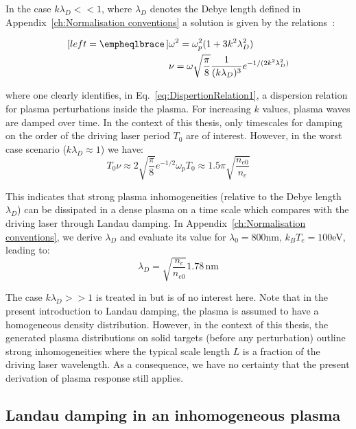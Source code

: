 \noindent In the case $k \lambda_D << 1$, where $\lambda_D$ denotes the Debye length defined in Appendix~\ref{ch:Normalisation conventions} a solution is given by the relations~\cite{vlasov1945theory}:

\begin{subequations}
\label{eq:DispertionRelation}
\begin{align}[left = \empheqlbrace\,]
     &\omega^2 = \omega_p^2(1+3k^2\lambda_D^2)\label{eq:DispertionRelation1}\\
     & \nu = \omega \sqrt{\frac{\pi}{8}}\frac{1}{(k\lambda_D)^{3}}e^{-1/(2k^2\lambda_D^2)} \label{eq:DispertionRelation2}
\end{align}
\end{subequations}

\noindent where one clearly identifies, in Eq.~\ref{eq:DispertionRelation1}, a dispersion relation for plasma perturbations inside the plasma. For increasing $k$ values, plasma waves are damped over time. 
In the context of this thesis, only timescales for damping on the order of  the driving laser period $T_0$ are of interest. However, in the worst case scenario ($k\lambda_D\approx 1$) we have:
$$
T_0 \nu \approx 2\sqrt{\frac{\pi}{8}}e^{-1/2} \omega_p T_0  \approx 1.5 \pi \sqrt{\frac{n_{e0}}{n_{c}}}
$$

\noindent This indicates that strong plasma inhomogeneities (relative to the Debye length $\lambda_D$) can be dissipated in a dense plasma on a time scale which compares with the driving laser through Landau damping. In Appendix~\ref{ch:Normalisation conventions}, we derive $\lambda_D$ and evaluate its value for $\lambda_0 = 800$nm, $k_BT_e = 100$eV, leading to:
\begin{equation}
\lambda_D = \sqrt{\frac{n_c}{n_{e0}}}1.78\,\mathrm{nm}
\end{equation}

\noindent The case $k \lambda_D >> 1$ is treated in \cite{landau1946vibrations} but is of no interest here. Note that in the present introduction to Landau damping, the plasma is assumed to have a homogeneous density distribution. However, in the context of this thesis,
the generated plasma distributions on solid targets (before any perturbation) outline strong inhomogeneities where the typical scale length $L$ is a fraction of the driving laser wavelength. As a consequence, we have no certainty that the present derivation of plasma response still applies. 

\subsection{Landau damping in an inhomogeneous plasma}

